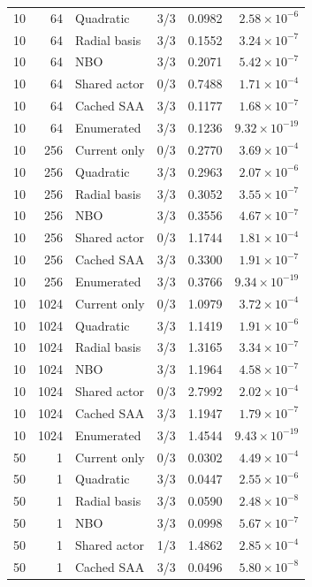 \begin{longtable}{rrlrrr}
10 & 64 & Quadratic & 3/3 & 0.0982 & $2.58\times10^{-6}$\\
10 & 64 & Radial basis & 3/3 & 0.1552 & $3.24\times10^{-7}$\\
10 & 64 & NBO & 3/3 & 0.2071 & $5.42\times10^{-7}$\\
10 & 64 & Shared actor & 0/3 & 0.7488 & $1.71\times10^{-4}$\\
10 & 64 & Cached SAA & 3/3 & 0.1177 & $1.68\times10^{-7}$\\
10 & 64 & Enumerated & 3/3 & 0.1236 & $9.32\times10^{-19}$\\
10 & 256 & Current only & 0/3 & 0.2770 & $3.69\times10^{-4}$\\
10 & 256 & Quadratic & 3/3 & 0.2963 & $2.07\times10^{-6}$\\
10 & 256 & Radial basis & 3/3 & 0.3052 & $3.55\times10^{-7}$\\
10 & 256 & NBO & 3/3 & 0.3556 & $4.67\times10^{-7}$\\
10 & 256 & Shared actor & 0/3 & 1.1744 & $1.81\times10^{-4}$\\
10 & 256 & Cached SAA & 3/3 & 0.3300 & $1.91\times10^{-7}$\\
10 & 256 & Enumerated & 3/3 & 0.3766 & $9.34\times10^{-19}$\\
10 & 1024 & Current only & 0/3 & 1.0979 & $3.72\times10^{-4}$\\
10 & 1024 & Quadratic & 3/3 & 1.1419 & $1.91\times10^{-6}$\\
10 & 1024 & Radial basis & 3/3 & 1.3165 & $3.34\times10^{-7}$\\
10 & 1024 & NBO & 3/3 & 1.1964 & $4.58\times10^{-7}$\\
10 & 1024 & Shared actor & 0/3 & 2.7992 & $2.02\times10^{-4}$\\
10 & 1024 & Cached SAA & 3/3 & 1.1947 & $1.79\times10^{-7}$\\
10 & 1024 & Enumerated & 3/3 & 1.4544 & $9.43\times10^{-19}$\\
50 & 1 & Current only & 0/3 & 0.0302 & $4.49\times10^{-4}$\\
50 & 1 & Quadratic & 3/3 & 0.0447 & $2.55\times10^{-6}$\\
50 & 1 & Radial basis & 3/3 & 0.0590 & $2.48\times10^{-8}$\\
50 & 1 & NBO & 3/3 & 0.0998 & $5.67\times10^{-7}$\\
50 & 1 & Shared actor & 1/3 & 1.4862 & $2.85\times10^{-4}$\\
50 & 1 & Cached SAA & 3/3 & 0.0496 & $5.80\times10^{-8}$\\

\end{longtable}
